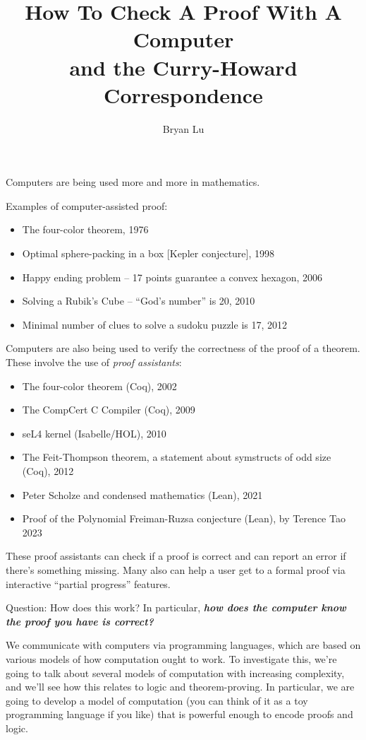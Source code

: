 \documentclass[12pt, nodate]{scrartcl}
\title{How To Check A Proof With A Computer \\ and the Curry-Howard Correspondence}
\author{Bryan Lu}
\begin{document}
\maketitle

Computers are being used more and more in mathematics. 

Examples of computer-assisted proof: 
\begin{itemize}
  \item The four-color theorem, 1976
  \item Optimal sphere-packing in a box [Kepler conjecture], 1998
  \item Happy ending problem -- 17 points guarantee a convex hexagon, 2006
  \item Solving a Rubik's Cube -- ``God's number'' is 20, 2010 
  \item Minimal number of clues to solve a sudoku puzzle is 17, 2012
\end{itemize}

Computers are also being used to verify the correctness of the proof of a
theorem. These involve the use of \emph{proof assistants}:
\begin{itemize}
  \item The four-color theorem (Coq), 2002
  \item The CompCert C Compiler (Coq), 2009
  \item seL4 kernel (Isabelle/HOL), 2010
  \item The Feit-Thompson theorem, a statement about symstructs of odd
    size (Coq), 2012
  \item Peter Scholze and condensed mathematics (Lean), 2021
  \item Proof of the Polynomial Freiman-Ruzsa conjecture (Lean), by Terence Tao 2023
\end{itemize}
These proof assistants can check if a proof is correct and can report an error
if there's something missing. Many also can help a user get to a formal
proof via interactive ``partial progress'' features.

Question: How does this work? In particular, \textbf{\textit{how does the computer know the proof you have is correct?}} 

We communicate with computers via programming languages, which are based on
various models of how computation ought to work. 
To investigate this, we're going to talk about several models of computation
with increasing complexity, and we'll see how this relates to logic and
theorem-proving. In particular, we are going to develop a model of computation
(you can think of it as a toy programming language if you like) that is powerful
enough to encode proofs and logic. 
\end{document}
